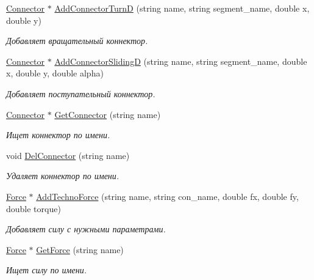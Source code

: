 \begin{DoxyCompactItemize}
\hyperlink{struct_connector}{Connector} $\ast$ \hyperlink{class_comp_manager_ab780d475031982a4f8630fbcae3f36f5}{AddConnectorTurnD} (string name, string segment\_\-name, double x, double y)
\begin{DoxyCompactList}\small\item\em Добавляет вращательный коннектор. \item\end{DoxyCompactList}\item 
\hyperlink{struct_connector}{Connector} $\ast$ \hyperlink{class_comp_manager_a26f530dc0ce0747bad73f7c25f4aaa8e}{AddConnectorSlidingD} (string name, string segment\_\-name, double x, double y, double alpha)
\begin{DoxyCompactList}\small\item\em Добавляет поступательный коннектор. \item\end{DoxyCompactList}\item 
\hyperlink{struct_connector}{Connector} $\ast$ \hyperlink{class_comp_manager_a7c71c8cd9c3d554bdad12e20e1fe5385}{GetConnector} (string name)
\begin{DoxyCompactList}\small\item\em Ищет коннектор по имени. \item\end{DoxyCompactList}\item 
void \hyperlink{class_comp_manager_a94587a431d85adb01d8cf016f115f32a}{DelConnector} (string name)
\begin{DoxyCompactList}\small\item\em Удаляет коннектор по имени. \item\end{DoxyCompactList}\item 
\hyperlink{class_force}{Force} $\ast$ \hyperlink{class_comp_manager_ae0d3f85a00d2413d78a7379592515266}{AddTechnoForce} (string name, string con\_\-name, double fx, double fy, double torque)
\begin{DoxyCompactList}\small\item\em Добавляет силу с нужными параметрами. \item\end{DoxyCompactList}\item 
\hyperlink{class_force}{Force} $\ast$ \hyperlink{class_comp_manager_a3fb340abc60404300b573ecbd3194e48}{GetForce} (string name)
\begin{DoxyCompactList}\small\item\em Ищет силу по имени. \item\end{DoxyCompactList}\item 

\end{DoxyCompactItemize}
